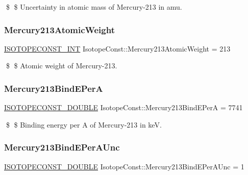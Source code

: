 \$ \$ Uncertainty in atomic mass of Mercury-\/213 in amu. \mbox{\label{group___isotope_const-_mercury-_hg213_ga9c8a8e92a1e71803a03fca4b819ef6a7}} 
\subsubsection{\texorpdfstring{Mercury213\+Atomic\+Weight}{Mercury213AtomicWeight}}
{\footnotesize\ttfamily \mbox{\hyperlink{group___isotope_const-_macros_ga5f18360b3e99483a35c32d789e62621c}{I\+S\+O\+T\+O\+P\+E\+C\+O\+N\+S\+T\+\_\+\+I\+NT}} Isotope\+Const\+::\+Mercury213\+Atomic\+Weight = 213}

\$ \$ Atomic weight of Mercury-\/213. \mbox{\label{group___isotope_const-_mercury-_hg213_gaef710d3d7deb46e1b1b558c0f4dcf3aa}} 
\subsubsection{\texorpdfstring{Mercury213\+Bind\+E\+PerA}{Mercury213BindEPerA}}
{\footnotesize\ttfamily \mbox{\hyperlink{group___isotope_const-_macros_ga8f45a7272ce02c0b4c65c44636ed719a}{I\+S\+O\+T\+O\+P\+E\+C\+O\+N\+S\+T\+\_\+\+D\+O\+U\+B\+LE}} Isotope\+Const\+::\+Mercury213\+Bind\+E\+PerA = 7741}

\$ \$ Binding energy per A of Mercury-\/213 in keV. \mbox{\label{group___isotope_const-_mercury-_hg213_gaf625bcba8ec3f501b7c18e40ede32c03}} 
\subsubsection{\texorpdfstring{Mercury213\+Bind\+E\+Per\+A\+Unc}{Mercury213BindEPerAUnc}}
{\footnotesize\ttfamily \mbox{\hyperlink{group___isotope_const-_macros_ga8f45a7272ce02c0b4c65c44636ed719a}{I\+S\+O\+T\+O\+P\+E\+C\+O\+N\+S\+T\+\_\+\+D\+O\+U\+B\+LE}} Isotope\+Const\+::\+Mercury213\+Bind\+E\+Per\+A\+Unc = 1}

